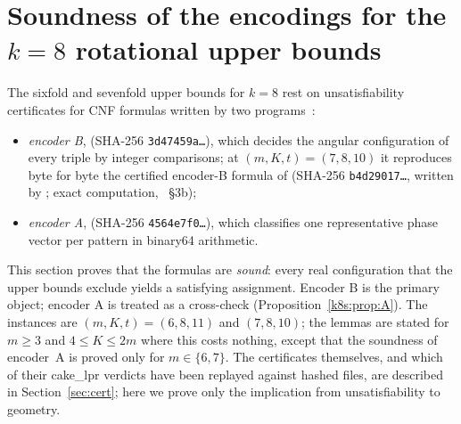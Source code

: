 %

\providecommand{\py}[1]{{\upshape\nolinkurl{#1}}}
\providecommand{\sgn}{\operatorname{sgn}}
\providecommand{\dirv}{\operatorname{dir}}

\section{Soundness of the encodings for the \texorpdfstring{$k=8$}{k=8} rotational upper bounds}\label{k8s:sec}

The sixfold and sevenfold upper bounds for $k=8$ rest on unsatisfiability certificates for CNF formulas written by
two programs~\cite{Supp}:
\begin{itemize}
\item \emph{encoder B},  (SHA-256 \texttt{3d47459a\dots}), which decides the angular
configuration of every triple by integer comparisons; at $(m,K,t)=(7,8,10)$ it reproduces byte for byte the certified
encoder-B formula of  (SHA-256 \texttt{b4d29017\dots}, written by ; exact
computation, ~\S3b);
\item \emph{encoder A},  (SHA-256 \texttt{4564e7f0\dots}), which classifies one representative
phase vector per pattern in binary64 arithmetic.
\end{itemize}
This section proves that the formulas are \emph{sound}: every real configuration that the upper bounds exclude
yields a satisfying assignment. Encoder B is the primary object; encoder A is treated as a cross-check
(Proposition~\ref{k8s:prop:A}). The instances are $(m,K,t)=(6,8,11)$ and $(7,8,10)$; the lemmas are stated for $m\ge3$
and $4\le K\le 2m$ where this costs nothing, except that the soundness of encoder~A is proved only for
$m\in\{6,7\}$. The certificates themselves, and which of their cake\_lpr verdicts have
been replayed against hashed files, are described in Section~\ref{sec:cert}; here we prove only the implication from unsatisfiability to geometry.

